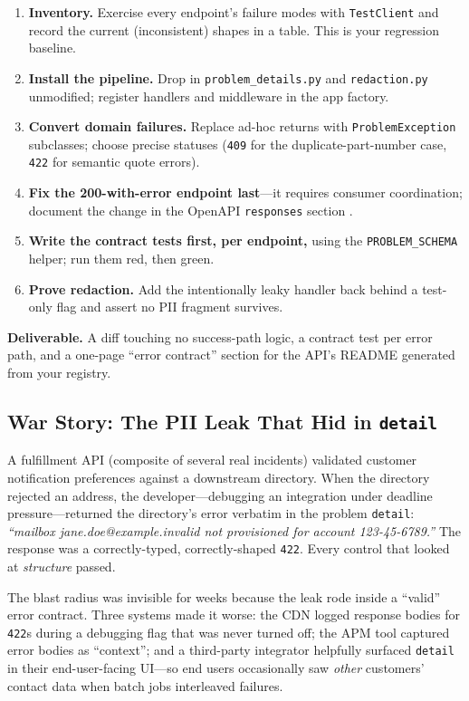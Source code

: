\begin{enumerate}
  \item \textbf{Inventory.} Exercise every endpoint's failure modes with
        \texttt{TestClient} and record the current (inconsistent) shapes in
        a table. This is your regression baseline.
  \item \textbf{Install the pipeline.} Drop in \texttt{problem\_details.py}
        and \texttt{redaction.py} unmodified; register handlers and
        middleware in the app factory.
  \item \textbf{Convert domain failures.} Replace ad-hoc returns with
        \texttt{ProblemException} subclasses; choose precise statuses
        (\texttt{409} for the duplicate-part-number case, \texttt{422} for
        semantic quote errors).
  \item \textbf{Fix the 200-with-error endpoint last}---it requires
        consumer coordination; document the change in the OpenAPI
        \texttt{responses} section \cite{openapi31}.
  \item \textbf{Write the contract tests first, per endpoint,} using the
        \texttt{PROBLEM\_SCHEMA} helper; run them red, then green.
  \item \textbf{Prove redaction.} Add the intentionally leaky handler back
        behind a test-only flag and assert no PII fragment survives.
\end{enumerate}

\textbf{Deliverable.} A diff touching no success-path logic, a contract test
per error path, and a one-page ``error contract'' section for the API's
README generated from your registry.

\subsection{War Story: The PII Leak That Hid in \texttt{detail}}

A fulfillment API (composite of several real incidents) validated customer
notification preferences against a downstream directory. When the directory
rejected an address, the developer---debugging an integration under deadline
pressure---returned the directory's error verbatim in the problem
\texttt{detail}: \emph{``mailbox jane.doe@example.invalid not provisioned for
account 123-45-6789.''} The response was a correctly-typed, correctly-shaped
\texttt{422}. Every control that looked at \emph{structure} passed.

The blast radius was invisible for weeks because the leak rode inside a
``valid'' error contract. Three systems made it worse: the CDN logged
response bodies for \texttt{422}s during a debugging flag that was never
turned off; the APM tool captured error bodies as ``context''; and a
third-party integrator helpfully surfaced \texttt{detail} in their
end-user-facing UI---so end users occasionally saw \emph{other} customers'
contact data when batch jobs interleaved failures.

